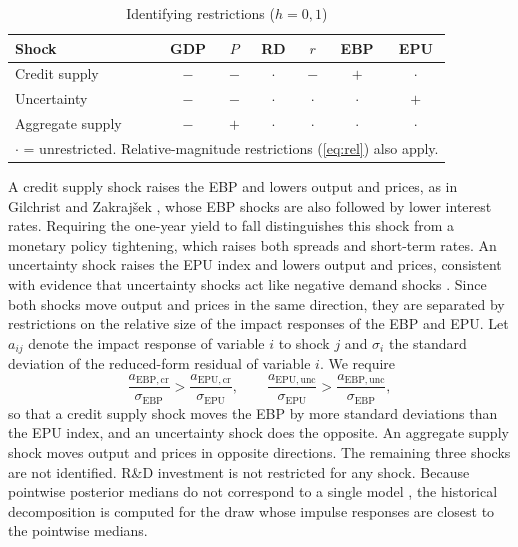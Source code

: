 \documentclass[conference]{IEEEtran}
\begin{document}
\begin{table}[t]
\caption{Identifying restrictions ($h=0,1$)}
\label{tab:signs}
\centering\footnotesize
\begin{tabular}{lcccccc}
\hline
Shock & GDP & $P$ & RD & $r$ & EBP & EPU \\
\hline
Credit supply & $-$ & $-$ & $\cdot$ & $-$ & $+$ & $\cdot$ \\
Uncertainty & $-$ & $-$ & $\cdot$ & $\cdot$ & $\cdot$ & $+$ \\
Aggregate supply & $-$ & $+$ & $\cdot$ & $\cdot$ & $\cdot$ & $\cdot$ \\
\hline
\multicolumn{7}{l}{\scriptsize $\cdot$ = unrestricted. Relative-magnitude restrictions (\ref{eq:rel}) also apply.}
\end{tabular}
\end{table}

A credit supply shock raises the EBP and lowers output and prices, as in
Gilchrist and Zakraj\v{s}ek \cite{gilchrist2012}, whose EBP shocks are also
followed by lower interest rates. Requiring the one-year yield to fall
distinguishes this shock from a monetary policy tightening, which raises both
spreads and short-term rates. An uncertainty shock raises the EPU index and
lowers output and prices, consistent with evidence that uncertainty shocks act
like negative demand shocks \cite{leduc2016}. Since both shocks move output and
prices in the same direction, they are separated by restrictions on the
relative size of the impact responses of the EBP and EPU. Let $a_{ij}$ denote
the impact response of variable $i$ to shock $j$ and $\sigma_i$ the standard
deviation of the reduced-form residual of variable $i$. We require
\begin{equation}
\frac{a_{\mathrm{EBP},\mathrm{cr}}}{\sigma_{\mathrm{EBP}}}>
\frac{a_{\mathrm{EPU},\mathrm{cr}}}{\sigma_{\mathrm{EPU}}},
\qquad
\frac{a_{\mathrm{EPU},\mathrm{unc}}}{\sigma_{\mathrm{EPU}}}>
\frac{a_{\mathrm{EBP},\mathrm{unc}}}{\sigma_{\mathrm{EBP}}},
\label{eq:rel}
\end{equation}
so that a credit supply shock moves the EBP by more standard deviations than
the EPU index, and an uncertainty shock does the opposite. An aggregate supply
shock moves output and prices in opposite directions. The remaining three
shocks are not identified. R\&D investment is not restricted for any shock.
Because pointwise posterior medians do not correspond to a single model
\cite{fry2011}, the historical decomposition is computed for the draw whose
impulse responses are closest to the pointwise medians.
\end{document}
